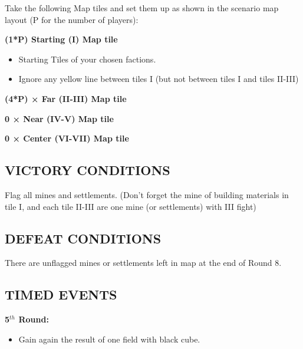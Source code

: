 \begin{multicols*}{2}
Take the following Map tiles and set them up as shown in the scenario map layout (P for the number of players):

\textbf{(1*P) Starting (I) Map tile}
\begin{itemize}
  \item Starting Tiles of your chosen factions.
  \item Ignore any yellow line between tiles I (but not between tiles I and tiles II-III)
\end{itemize}

\textbf{(4*P) × Far (II-III) Map tile}

\textbf{0 × Near (IV-V) Map tile}

\textbf{0 × Center (VI-VII) Map tile}

\subsection*{\MakeUppercase{Victory Conditions}}

Flag all mines and settlements. (Don't forget the mine of building materials in tile I, and each tile II-III are one mine (or settlements) with III fight)

\subsection*{\MakeUppercase{Defeat Conditions}}

There are unflagged mines or settlements left in map at the end of Round 8.

\subsection*{\MakeUppercase{Timed Events}}

\textbf{5$^{th}$ Round:}
\begin{itemize}
  \item Gain again the result of one field with black cube.
\end{itemize}


\end{multicols*}
